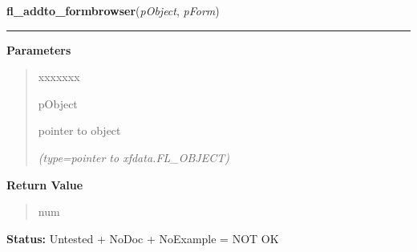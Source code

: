 \hspace{.8\funcindent}\begin{boxedminipage}{\funcwidth}

    \raggedright \textbf{fl\_addto\_formbrowser}(\textit{pObject}, \textit{pForm})

    \vspace{-1.5ex}

    \rule{\textwidth}{0.5\fboxrule}
\setlength{\parskip}{2ex}
\setlength{\parskip}{1ex}
      \textbf{Parameters}
      \vspace{-1ex}

      \begin{quote}
        \begin{Ventry}{xxxxxxx}

          \item[pObject]

          pointer to object

            {\it (type=pointer to xfdata.FL\_OBJECT)}

        \end{Ventry}

      \end{quote}

      \textbf{Return Value}
    \vspace{-1ex}

      \begin{quote}
      num

      \end{quote}

\textbf{Status:} Untested + NoDoc + NoExample = NOT OK



    \end{boxedminipage}

    \label{xformslib:library:fl_delete_formbrowser_bynumber}

    \vspace{0.5ex}

